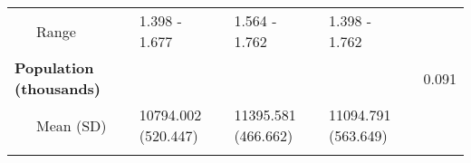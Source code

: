 \begin{longtable}[c]{@{}lllll@{}}
\begin{minipage}[t]{0.33\columnwidth}\raggedright
~~~Range
\end{minipage} & \begin{minipage}[t]{0.15\columnwidth}\raggedright
1.398 - 1.677
\end{minipage} & \begin{minipage}[t]{0.15\columnwidth}\raggedright
1.564 - 1.762
\end{minipage} & \begin{minipage}[t]{0.15\columnwidth}\raggedright
1.398 - 1.762
\end{minipage} & \begin{minipage}[t]{0.52\columnwidth}\raggedright
\end{minipage}
\\\addlinespace
\begin{minipage}[t]{0.33\columnwidth}\raggedright
\textbf{Population (thousands)}
\end{minipage} & \begin{minipage}[t]{0.15\columnwidth}\raggedright
\end{minipage} & \begin{minipage}[t]{0.15\columnwidth}\raggedright
\end{minipage} & \begin{minipage}[t]{0.15\columnwidth}\raggedright
\end{minipage} & \begin{minipage}[t]{0.52\columnwidth}\raggedright
0.091
\end{minipage}
\\\addlinespace
\begin{minipage}[t]{0.33\columnwidth}\raggedright
~~~Mean (SD)
\end{minipage} & \begin{minipage}[t]{0.15\columnwidth}\raggedright
10794.002 (520.447)
\end{minipage} & \begin{minipage}[t]{0.15\columnwidth}\raggedright
11395.581 (466.662)
\end{minipage} & \begin{minipage}[t]{0.15\columnwidth}\raggedright
11094.791 (563.649)
\end{minipage} & \begin{minipage}[t]{0.52\columnwidth}\raggedright
\end{minipage}
\\\addlinespace
\begin{minipage}[t]{0.33\columnwidth}\raggedright

\end{minipage}
\end{longtable}
